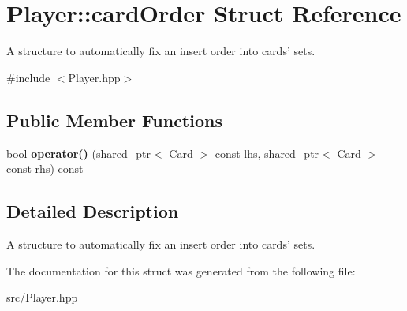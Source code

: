 \hypertarget{structPlayer_1_1cardOrder}{\section{Player\-:\-:card\-Order Struct Reference}
\label{structPlayer_1_1cardOrder}
}


A structure to automatically fix an insert order into cards' sets.  




{\ttfamily \#include $<$Player.\-hpp$>$}

\subsection*{Public Member Functions}
\begin{DoxyCompactItemize}
\item 
\hypertarget{structPlayer_1_1cardOrder_a1992ec2fb8b64e0749dcbbf997a56846}{bool {\bfseries operator()} (shared\-\_\-ptr$<$ \hyperlink{classCard}{Card} $>$ const lhs, shared\-\_\-ptr$<$ \hyperlink{classCard}{Card} $>$ const rhs) const }\label{structPlayer_1_1cardOrder_a1992ec2fb8b64e0749dcbbf997a56846}

\end{DoxyCompactItemize}


\subsection{Detailed Description}
A structure to automatically fix an insert order into cards' sets. 

The documentation for this struct was generated from the following file\-:\begin{DoxyCompactItemize}
\item 
src/Player.\-hpp\end{DoxyCompactItemize}
